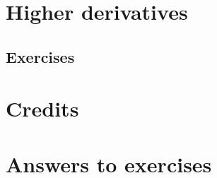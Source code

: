 \documentclass{fts_m2}
\begin{document}
    \section{Higher derivatives}
    
    \subsection*{Exercises}
    

    \appendix

    \section{Credits}
    
    
    \section{Answers to exercises}
    
\end{document}
